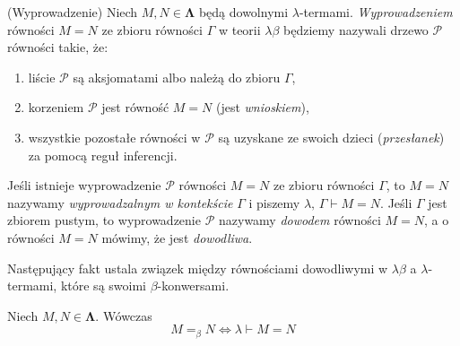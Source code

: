 \begin{definicja}(Wyprowadzenie)
Niech \(M, N\in\mathbf{\Lambda}\) będą dowolnymi \(\lambda\)-termami.
\emph{Wyprowadzeniem} równości \(M=N\) ze zbioru równości \(\Gamma\) w teorii \(\lambda\beta\) będziemy nazywali drzewo \(\mathcal{P}\) równości takie, że:
\begin{enumerate}[label={(\roman*)}, ref={(\roman*)}]
  \setlength\itemsep{0em}
  \item liście \(\mathcal{P}\) są aksjomatami albo należą do zbioru \(\Gamma\),
  \item korzeniem \(\mathcal{P}\) jest równość \(M=N\) (jest \emph{wnioskiem}),
  \item wszystkie pozostałe równości w \(\mathcal{P}\) są uzyskane ze swoich dzieci (\emph{przesłanek}) za pomocą reguł inferencji.
\end{enumerate}

Jeśli istnieje wyprowadzenie \(\mathcal{P}\) równości \(M=N\) ze zbioru równości \(\Gamma\), to \(M=N\) nazywamy \emph{wyprowadzalnym w kontekście} \(\Gamma\) i piszemy \(\lambda,\,\Gamma\vdash M=N\). Jeśli \(\Gamma\) jest zbiorem pustym, to wyprowadzenie \(\mathcal{P}\) nazywamy \emph{dowodem} równości \(M=N\), a o równości \(M=N\) mówimy, że jest \emph{dowodliwa}.
\end{definicja}

Następujący fakt ustala związek między równościami dowodliwymi w \(\lambda\beta\) a \(\lambda\)-termami, które są swoimi \(\beta\)-konwersami.
\begin{fakt}
Niech \(M, N\in\mathbf{\Lambda}\). Wówczas
\[
M=_\beta N \iff \lambda \vdash M=N
\]
\end{fakt}
